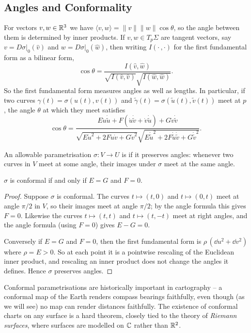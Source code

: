 \documentclass[a4paper]{scrartcl}
\begin{document}
\subsection{Angles and Conformality}

For vectors $v, w \in \mathbb{R}^3$ we have $\langle v, w \rangle = \|v\| \|w\| \cos\theta$, so the angle between them is determined by inner products. If $v, w \in T_p \Sigma$ are tangent vectors, say $v = D\sigma|_0(\hat{v})$ and $w = D\sigma|_0(\hat{w})$, then writing $I(\cdot\, , \cdot)$ for the first fundamental form as a bilinear form,
$$
\cos \theta = \frac{I(\hat v, \hat w)}{\sqrt{I(\hat v, \hat v)}\sqrt{I(\hat w, \hat w)}}.
$$
So the first fundamental form measures angles as well as lengths. In particular, if two curves $\gamma(t) = \sigma(u(t), v(t))$ and $\tilde{\gamma}(t) = \sigma(\tilde{u}(t), \tilde v(t))$ meet at $p$, the angle $\theta$ at which they meet satisfies
$$
\cos\theta = \frac{E \dot u \dot{\tilde u} + F (\dot u \dot{\tilde v} + \dot v \dot{\tilde u}) + G \dot v \dot{\tilde v}}{\sqrt{E \dot u^2 + 2F \dot u \dot v + G \dot v^2}\sqrt{E \dot{\tilde u}^2 + 2F \dot{\tilde u}\dot{\tilde v} + G \dot{\tilde v}^2}}.
$$

\begin{definition}[Conformal]
    An allowable parametrisation $\sigma: V \rightarrow U$ is  if it preserves angles: whenever two curves in $V$ meet at some angle, their images under $\sigma$ meet at the same angle.
\end{definition}

\begin{lemma}
    $\sigma$ is conformal if and only if $E = G$ and $F = 0$.
\end{lemma}
\begin{proof}
    Suppose $\sigma$ is conformal. The curves $t \mapsto (t, 0)$ and $t \mapsto (0, t)$ meet at angle $\pi/2$ in $V$, so their images meet at angle $\pi/2$; by the angle formula this gives $F = 0$. Likewise the curves $t \mapsto (t, t)$ and $t \mapsto (t, -t)$ meet at right angles, and the angle formula (using $F = 0$) gives $E - G = 0$.

    Conversely if $E = G$ and $F = 0$, then the first fundamental form is $\rho\,(\dd u^2 + \dd v^2)$ where $\rho = E > 0$. So at each point it is a pointwise rescaling of the Euclidean inner product, and rescaling an inner product does not change the angles it defines. Hence $\sigma$ preserves angles.
\end{proof}

\begin{remark}
    Conformal parametrisations are historically important in cartography -- a conformal map of the Earth renders compass bearings faithfully, even though (as we will see) no map can render distances faithfully. The existence of conformal charts on any surface is a hard theorem, closely tied to the theory of \emph{Riemann surfaces}, where surfaces are modelled on $\mathbb{C}$ rather than $\mathbb{R}^2$.
\end{remark}
\end{document}
